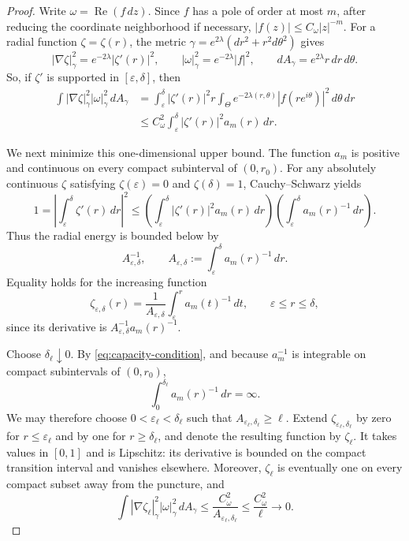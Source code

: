 \documentclass[10pt,a4paper]{amsart}
\DeclareMathOperator{\Rea}{Re}
\begin{document}
\begin{proof}
Write $\omega=\Rea(f\,dz)$. Since $f$ has a pole of order at
most $m$, after reducing the coordinate neighborhood if necessary,
\(
|f(z)|\le C_\omega |z|^{-m}.
\)
For a radial function $\zeta=\zeta(r)$, the metric
$\gamma=e^{2\lambda}(dr^2+r^2d\theta^2)$ gives
\[
|\nabla\zeta|_\gamma^2=e^{-2\lambda}|\zeta'(r)|^2,
\qquad
|\omega|_\gamma^2=e^{-2\lambda}|f|^2,
\qquad
dA_\gamma=e^{2\lambda}r\,dr\,d\theta.
\]
So, if $\zeta'$ is supported in
$[\varepsilon,\delta]$, then
\begin{align*}
\int |\nabla\zeta|_\gamma^2|\omega|_\gamma^2\,dA_\gamma
&=\int_\varepsilon^\delta |\zeta'(r)|^2r
  \int_\Theta e^{-2\lambda(r,\theta)}
  |f(re^{i\theta})|^2\,d\theta\,dr\\
&\le C_\omega^2
  \int_\varepsilon^\delta|\zeta'(r)|^2a_m(r)\,dr.
\end{align*}

We next minimize this one-dimensional upper bound. The function
$a_m$ is positive and continuous on every compact subinterval
of $(0,r_0)$. For any absolutely continuous $\zeta$ satisfying
$\zeta(\varepsilon)=0$ and $\zeta(\delta)=1$,
Cauchy--Schwarz yields
\[
1
=\left|\int_\varepsilon^\delta\zeta'(r)\,dr\right|^2
\le
\left(\int_\varepsilon^\delta
|\zeta'(r)|^2a_m(r)\,dr\right)
\left(\int_\varepsilon^\delta a_m(r)^{-1}\,dr\right).
\]
Thus the radial energy is bounded below by
\[
A_{\varepsilon,\delta}^{-1},
\qquad
A_{\varepsilon,\delta}
:=\int_\varepsilon^\delta a_m(r)^{-1}\,dr.
\]
Equality holds for the increasing function
\[
\zeta_{\varepsilon,\delta}(r)
=
\frac{1}{A_{\varepsilon,\delta}}
\int_\varepsilon^r a_m(t)^{-1}\,dt,
\qquad \varepsilon\le r\le\delta,
\]
since its derivative is
$A_{\varepsilon,\delta}^{-1}a_m(r)^{-1}$.

Choose $\delta_\ell\downarrow0$. By
\eqref{eq:capacity-condition}, and because $a_m^{-1}$ is
integrable on compact subintervals of $(0,r_0)$,
\[
\int_0^{\delta_\ell}a_m(r)^{-1}\,dr=\infty.
\]
We may therefore choose $0<\varepsilon_\ell<\delta_\ell$ such that
$A_{\varepsilon_\ell,\delta_\ell}\ge\ell$. Extend
$\zeta_{\varepsilon_\ell,\delta_\ell}$ by zero for
$r\le\varepsilon_\ell$ and by one for $r\ge\delta_\ell$,
and denote the resulting function by $\zeta_\ell$.
It takes values in $[0,1]$ and is Lipschitz: its derivative is
bounded on the compact transition interval and vanishes elsewhere.
Moreover, $\zeta_\ell$ is eventually one on every compact subset
away from the puncture, and
\[
\int |\nabla\zeta_\ell|_\gamma^2|\omega|_\gamma^2\,dA_\gamma
\le \frac{C_\omega^2}{A_{\varepsilon_\ell,\delta_\ell}}
\le \frac{C_\omega^2}{\ell}\longrightarrow0.
\]


\end{proof}
\end{document}
